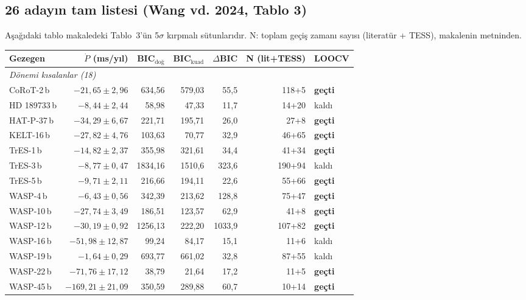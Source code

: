 \subsection{26 adayın tam listesi (Wang vd. 2024, Tablo 3)}

Aşağıdaki tablo makaledeki Tablo~3'ün 5$\sigma$ kırpmalı sütunlarıdır. N: toplam geçiş zamanı sayısı
(literatür + TESS), makalenin metninden.

\begin{center}
\small
\begin{longtable}{l r r r r r l}
\toprule
Gezegen & $\dot P$ (ms/yıl) & BIC$_\text{doğ}$ & BIC$_\text{kuad}$ & $\Delta$BIC & N (lit+TESS) & LOOCV\\
\midrule
\endhead
\multicolumn{7}{l}{\emph{Dönemi kısalanlar (18)}}\\
CoRoT-2\,b   & $-21{,}65\pm2{,}96$  & 634,56 & 579,03 & 55,5 & 118+5 & \textbf{geçti}\\
HD 189733\,b & $-8{,}44\pm2{,}44$   & 58,98  & 47,33  & 11,7 & 14+20 & kaldı\\
HAT-P-37\,b  & $-34{,}29\pm6{,}67$  & 221,71 & 195,71 & 26,0 & 27+8  & \textbf{geçti}\\
KELT-16\,b   & $-27{,}82\pm4{,}76$  & 103,63 & 70,77  & 32,9 & 46+65 & \textbf{geçti}\\
TrES-1\,b    & $-14{,}82\pm2{,}37$  & 355,98 & 321,61 & 34,4 & 41+34 & \textbf{geçti}\\
TrES-3\,b    & $-8{,}77\pm0{,}47$   & 1834,16& 1510,6 & 323,6& 190+94& kaldı\\
TrES-5\,b    & $-9{,}71\pm2{,}11$   & 216,66 & 194,11 & 22,6 & 55+66 & \textbf{geçti}\\
WASP-4\,b    & $-6{,}43\pm0{,}56$   & 342,39 & 213,62 & 128,8& 75+47 & \textbf{geçti}\\
WASP-10\,b   & $-27{,}74\pm3{,}49$  & 186,51 & 123,57 & 62,9 & 41+8  & \textbf{geçti}\\
WASP-12\,b   & $-30{,}19\pm0{,}92$  & 1256,13& 222,20 & 1033,9&107+82& \textbf{geçti}\\
WASP-16\,b   & $-51{,}98\pm12{,}87$ & 99,24  & 84,17  & 15,1 & 11+6  & kaldı\\
WASP-19\,b   & $-1{,}64\pm0{,}29$   & 693,77 & 661,02 & 32,8 & 87+55 & kaldı\\
WASP-22\,b   & $-71{,}76\pm17{,}12$ & 38,79  & 21,64  & 17,2 & 11+5  & \textbf{geçti}\\
WASP-45\,b   & $-169{,}21\pm21{,}09$& 350,59 & 289,88 & 60,7 & 10+14 & \textbf{geçti}\\

\end{longtable}
\end{center}
